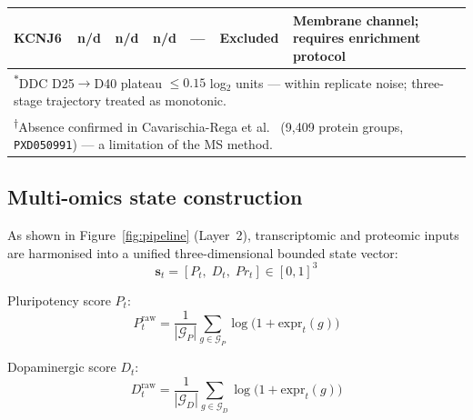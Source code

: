 \documentclass[5p,times,twocolumn]{elsarticle}
\newcommand{\lang}[1]{#1}
\begin{document}
\begin{table}[!htbp]
{\begin{tabular}{lcccccl}
      KCNJ6
      & n/d  & n/d   & n/d
      & ---
      & Excluded
      & Membrane channel; requires enrichment protocol \\
      \bottomrule
      \multicolumn{7}{l}{%
        \textsuperscript{$*$}DDC D25$\to$D40 plateau
        $\leq 0.15$ log$_{2}$ units --- within replicate noise;
        three-stage trajectory treated as monotonic.} \\
      \multicolumn{7}{l}{%
        \textsuperscript{$\dagger$}Absence confirmed in
        Cavarischia-Rega et al.~\cite{cavarischia2024proteome}
        (9,409 protein groups, \texttt{PXD050991}) ---
        \lang{a limitation of the MS method}.}
    \end{tabular}}
\end{table}

\subsection{\textbf{Multi-omics state construction}}
\label{sec:state}

As shown in Figure~\ref{fig:pipeline} (Layer~2),
transcriptomic and proteomic inputs are harmonised into
a unified three-dimensional bounded state vector:
%
\begin{equation}
  \mathbf{s}_{t} = [P_{t},\; D_{t},\; Pr_{t}] \in [0,1]^{3}
  \label{eq:state}
\end{equation}

Pluripotency score $P_{t}$:
%
\begin{equation}
  P_{t}^{\text{raw}} =
    \frac{1}{|\mathcal{G}_{P}|}
    \sum_{g \in \mathcal{G}_{P}} \log\!\bigl(1 + \text{expr}_{t}(g)\bigr)
  \label{eq:P}
\end{equation}

Dopaminergic score $D_{t}$:
%
\begin{equation}
  D_{t}^{\text{raw}} =
    \frac{1}{|\mathcal{G}_{D}|}
    \sum_{g \in \mathcal{G}_{D}} \log\!\bigl(1 + \text{expr}_{t}(g)\bigr)
  \label{eq:D}
\end{equation}
\end{document}
